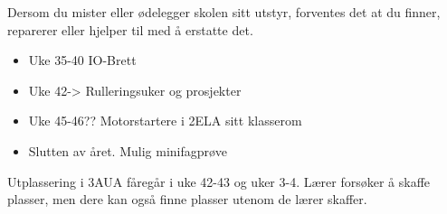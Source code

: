 
%

%

\noindent
{} Dersom du mister eller ødelegger skolen sitt utstyr, forventes det at du finner, reparerer eller hjelper til med å erstatte det. 
\vskip 10pt
\vfil
\noindent
{} 
\begin{itemize}
	\item Uke 35-40 IO-Brett
	\item Uke 42-> Rulleringsuker og prosjekter
	\item Uke 45-46?? Motorstartere i 2ELA sitt klasserom
	\item Slutten av året. Mulig minifagprøve
\end{itemize}
\vskip 10pt
\vfil
\noindent
{} Utplassering i 3AUA fåregår i uke 42-43 og uker 3-4. Lærer forsøker å skaffe plasser, men dere kan også finne plasser utenom de lærer skaffer. 
\vskip 10pt
\vfil


